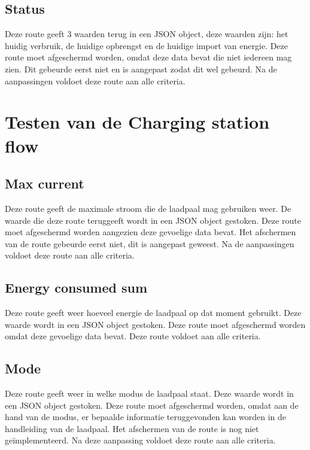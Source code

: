 \subsection{Status}
\label{subsec:testresultaten-elektriciteit-status}

Deze route geeft 3 waarden terug in een JSON object, deze waarden zijn: het huidig verbruik, de huidige opbrengst en de huidige import van energie. Deze route moet afgeschermd worden, omdat deze data bevat die niet iedereen mag zien. Dit gebeurde eerst niet en is aangepast zodat dit wel gebeurd. Na de aanpassingen voldoet deze route aan alle criteria.

\section{Testen van de Charging station flow}
\label{sec:testresultaten-charging-station}

\subsection{Max current}
\label{subsec:testresultaten-max-current}

Deze route geeft de maximale stroom die de laadpaal mag gebruiken weer. De waarde die deze route teruggeeft wordt in een JSON object gestoken. Deze route moet afgeschermd worden aangezien deze gevoelige data bevat. Het afschermen van de route gebeurde eerst niet, dit is aangepast geweest. Na de aanpassingen voldoet deze route aan alle criteria.

\subsection{Energy consumed sum}
\label{subsec:testresultaten-energy-consumed-sum}

Deze route geeft weer hoeveel energie de laadpaal op dat moment gebruikt. Deze waarde wordt in een JSON object gestoken. Deze route moet afgeschermd worden omdat deze gevoelige data bevat. Deze route voldoet aan alle criteria.

\subsection{Mode}
\label{subsec:testresultaten-mode}

Deze route geeft weer in welke modus de laadpaal staat. Deze waarde wordt in een JSON object gestoken. Deze route moet afgeschermd worden, omdat aan de hand van de modus, er bepaalde informatie teruggevonden kan worden in de handleiding van de laadpaal. Het afschermen van de route is nog niet geïmplementeerd. Na deze aanpassing voldoet deze route aan alle criteria.

